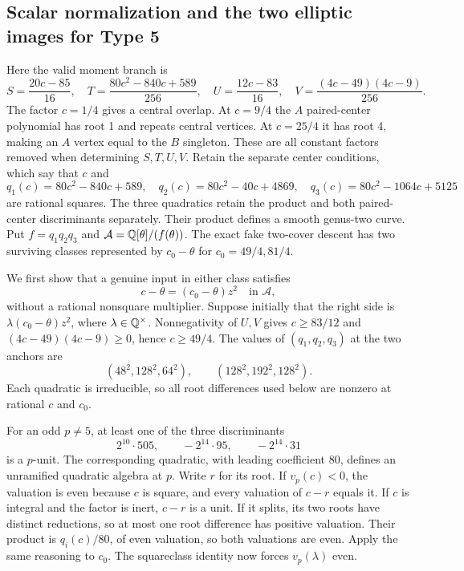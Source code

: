 \subsection{Scalar normalization and the two elliptic images for Type 5}\label{detail:type5}
Here the valid moment branch is
\[
 S=\frac{20c-85}{16},\quad T=\frac{80c^2-840c+589}{256},
 \quad U=\frac{12c-83}{16},\quad V=\frac{(4c-49)(4c-9)}{256}.
\]
The factor $c=1/4$ gives a central overlap. At $c=9/4$ the $A$
paired-center polynomial has root 1 and repeats central vertices.
At $c=25/4$ it has root 4, making an $A$ vertex equal to the $B$
singleton. These are all constant factors removed when determining
$S,T,U,V$.
Retain the separate center conditions, which say that $c$ and
\[
 q_1(c)=80c^2-840c+589,\quad q_2(c)=80c^2-40c+4869,
 \quad q_3(c)=80c^2-1064c+5125
\]
are rational squares. The three quadratics retain the product and
both paired-center discriminants separately. Their product defines a
smooth genus-two curve. Put $f=q_1q_2q_3$ and
$\mathcal A=\mathbb Q[\theta]/(f(\theta))$.
The exact fake two-cover descent has two surviving classes represented
by $c_0-\theta$ for $c_0=49/4,81/4$.

We first show that a genuine input in either class satisfies
\begin{equation}\label{eq:type5-normalized-class}
 c-\theta=(c_0-\theta)z^2\quad\text{in }\mathcal A,
\end{equation}
without a rational nonsquare multiplier. Suppose initially that the
right side is $\lambda(c_0-\theta)z^2$, where
$\lambda\in\mathbb Q^\times$. Nonnegativity of $U,V$ gives
$c\geq83/12$ and $(4c-49)(4c-9)\geq0$, hence $c\geq49/4$.
The values of $(q_1,q_2,q_3)$ at the two anchors are
\[
 (48^2,128^2,64^2),\qquad(128^2,192^2,128^2).
\]
Each quadratic is irreducible, so all root differences used below are
nonzero at rational $c$ and $c_0$.

For an odd $p\ne5$, at least one of the three discriminants
\[
 2^{10}\cdot505,\qquad-2^{14}\cdot95,\qquad-2^{14}\cdot31
\]
is a $p$-unit. The corresponding quadratic, with leading coefficient
80, defines an unramified quadratic algebra at $p$. Write $r$ for
its root. If $v_p(c)<0$, the valuation is even because $c$ is square,
and every valuation of $c-r$ equals it. If $c$ is integral and the
factor is inert, $c-r$ is a unit. If it splits, its two roots have
distinct reductions, so at most one root difference has positive
valuation. Their product is $q_i(c)/80$, of even valuation, so both
valuations are even. Apply the same reasoning to $c_0$.
The squareclass identity now forces $v_p(\lambda)$ even.

